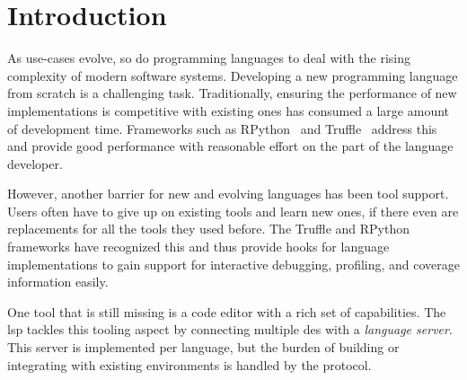 \documentclass[sigplan,10pt,screen]{acmart}
\begin{document}




\maketitle

\section{Introduction}
\label{cha:introduction}
As use-cases evolve, so do programming languages to deal with the rising
complexity of modern software systems. Developing a new programming language
from scratch is a challenging task. Traditionally, ensuring the performance
of new implementations is competitive with existing ones has consumed a large
amount of development time. Frameworks such as RPython~\cite{ancona2007rpython}
and Truffle~\cite{wimmer2012truffle} address this and provide good performance
with reasonable effort on the part of the language developer.

However, another barrier for new and evolving languages has been tool
support. Users often have to give up on existing tools and learn new ones, if
there even are replacements for all the tools they used before.
The Truffle and RPython frameworks have recognized this and
thus provide hooks for language implementations to gain support for interactive
debugging, profiling, and coverage information easily.

One tool that is still missing is a code editor with a rich set of
capabilities. The \ac{lsp} tackles this tooling aspect by connecting multiple
\acp{de} with a \emph{language server}. This server is implemented per language,
but the burden of building or integrating with existing environments is handled
by the protocol.
\end{document}
